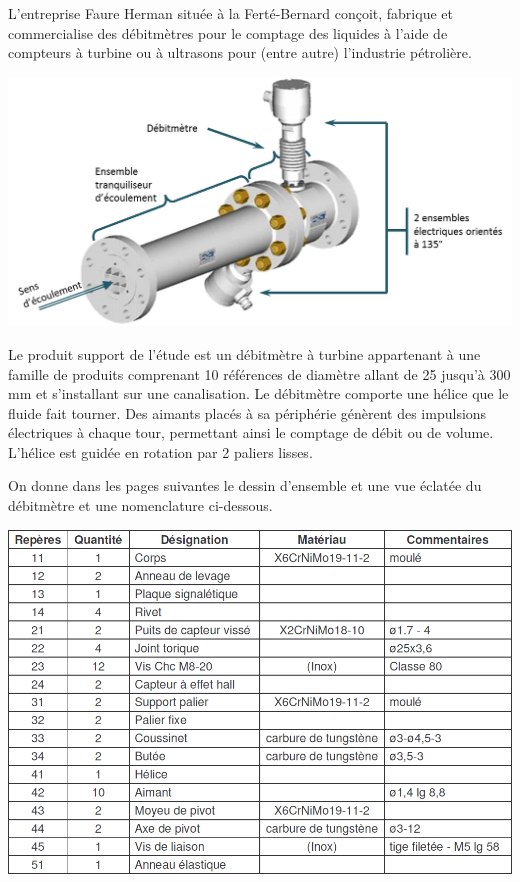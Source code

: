 \documentclass[10pt,fleqn]{article} %
\begin{document}
\begin{multicols}{2}
L’entreprise Faure Herman située à la Ferté-Bernard conçoit, fabrique et commercialise des débitmètres pour le comptage des liquides à l’aide de compteurs à turbine ou à ultrasons pour (entre autre) l'industrie pétrolière.
\begin{center}
\includegraphics[width=\linewidth]{images/debitmetre_02}
\end{center}
Le produit support de l’étude est un débitmètre à turbine appartenant à une famille de produits comprenant 10 références de diamètre allant de 25 jusqu'à 300 mm et s’installant sur une canalisation. Le débitmètre comporte une hélice que le fluide fait tourner. Des aimants placés à sa périphérie génèrent des impulsions électriques à chaque tour, permettant ainsi le comptage de débit ou de volume. L’hélice est guidée en rotation par 2 paliers lisses.



On donne dans les pages suivantes le dessin d'ensemble et une vue éclatée du débitmètre et une nomenclature ci-dessous.
\begin{center}
\includegraphics[width=\linewidth]{images/debitmetre_04}
\end{center}



\end{multicols}
\end{document}
